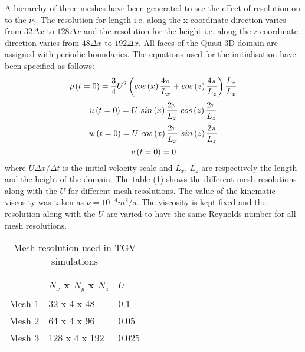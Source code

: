 A hierarchy of three meshes have been generated to see the effect of resolution on to the $\nu_t$. The resolution for length i.e. along the x-coordinate direction varies from $32\Delta x$ to $128\Delta x$ and the resolution for the height i.e. along the z-coordinate direction varies from $48\Delta x$ to $192\Delta x$. All faces of the Quasi 3D domain are assigned with periodic boundaries.
The equations used for the initialisation have been specified as follows:
%
\begin{equation}
\label{TGV den}
\rho\left(t=0\right) = \frac{3}{4} U^2 \left(cos\left(x\right)\frac{4\pi}{L_x} + cos\left(z\right)\frac{4\pi}{L_z}\right)\frac{L_z}{L_x}\\
\end{equation}
%
%
\begin{equation}
\label{TGV u}
u\left(t=0\right) = U\ sin\left(x\right)\frac{2\pi}{L_x}\ cos\left(z\right)\frac{2\pi}{L_z}\\
\end{equation}
%
%
\begin{equation}
\label{TGV w}
w\left(t=0\right) = U\ cos\left(x\right)\frac{2\pi}{L_x}\ sin\left(z\right)\frac{2\pi}{L_z}\\
\end{equation}
%
%
\begin{equation}
\label{TGV v}
v\left(t=0\right) = 0\\
\end{equation}
%
where $U \Delta x / \Delta t$ is the initial velocity scale and $L_x$, $L_z$ are respectively the length and the height of the domain. The table (\ref{resolution TGV}) shows the different mesh resolutions along with the $U$ for different mesh resolutions. The value of the kinematic viscosity was taken as $\nu = 10^{-4} m^2/s$. The viscosity is kept fixed and the resolution along with the $U$ are varied to have the same Reynolds number for all mesh resolutions. 
%
\begin{table}[h!]
\begin{center}
\begin{tabular}{ p{1.5cm}|p{2.5cm}|p{1cm}} 

 & $N_x$ x $N_y$ x $N_z$ & $U$\\
  \hline
   Mesh 1& 32 x 4 x 48 & 0.1\\
  \hline
  Mesh 2& 64 x 4 x 96 & 0.05\\
  \hline
  Mesh 3 & 128 x 4 x 192 & 0.025\\
  \hline
\end{tabular}
\end{center}
\caption{Mesh resolution used in TGV simulations}
\label{resolution TGV}
\end{table}
%
